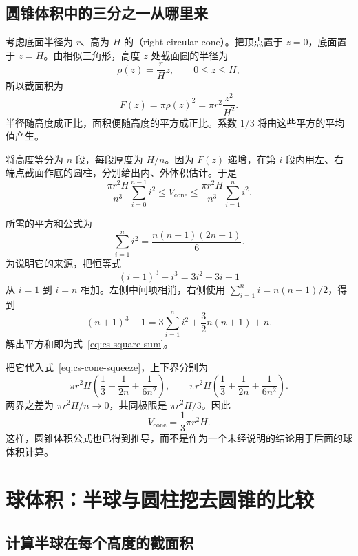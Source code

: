 \documentclass[UTF8]{ctexart}
\begin{document}
\subsection{圆锥体积中的三分之一从哪里来}

考虑底面半径为 $r$、高为 $H$ 的（right circular cone）。把顶点置于 $z=0$，底面置于 $z=H$。由相似三角形，高度 $z$ 处截面圆的半径为
\[
  \rho(z)=\frac rH z,\qquad 0\leq z\leq H,
\]
所以截面积为
\begin{equation}\label{eq:cs-cone-section}
  F(z)=\pi\rho(z)^2=\pi r^2\frac{z^2}{H^2}.
\end{equation}
半径随高度成正比，面积便随高度的平方成正比。系数 $1/3$ 将由这些平方的平均值产生。

将高度等分为 $n$ 段，每段厚度为 $H/n$。因为 $F(z)$ 递增，在第 $i$ 段内用左、右端点截面作底的圆柱，分别给出内、外体积估计。于是
\begin{equation}\label{eq:cs-cone-squeeze}
  \frac{\pi r^2H}{n^3}\sum_{i=0}^{n-1}i^2
  \leq V_{\mathrm{cone}}
  \leq\frac{\pi r^2H}{n^3}\sum_{i=1}^{n}i^2.
\end{equation}

所需的平方和公式为
\begin{equation}\label{eq:cs-square-sum}
  \sum_{i=1}^{n}i^2=\frac{n(n+1)(2n+1)}6.
\end{equation}
为说明它的来源，把恒等式
\[
  (i+1)^3-i^3=3i^2+3i+1
\]
从 $i=1$ 到 $i=n$ 相加。左侧中间项相消，右侧使用 $\sum_{i=1}^n i=n(n+1)/2$，得到
\[
  (n+1)^3-1=3\sum_{i=1}^{n}i^2+\frac32n(n+1)+n.
\]
解出平方和即为式~\eqref{eq:cs-square-sum}。

把它代入式~\eqref{eq:cs-cone-squeeze}，上下界分别为
\[
  \pi r^2H\left(\frac13-\frac1{2n}+\frac1{6n^2}\right),
  \qquad
  \pi r^2H\left(\frac13+\frac1{2n}+\frac1{6n^2}\right).
\]
两界之差为 $\pi r^2H/n\to0$，共同极限是 $\pi r^2H/3$。因此
\begin{equation}\label{eq:cs-cone-volume}
  \boxed{V_{\mathrm{cone}}=\frac13\pi r^2H}.
\end{equation}
这样，圆锥体积公式也已得到推导，而不是作为一个未经说明的结论用于后面的球体积计算。

\section{球体积：半球与圆柱挖去圆锥的比较}
\label{sec:cs-sphere-volume}

\subsection{计算半球在每个高度的截面积}
\end{document}
